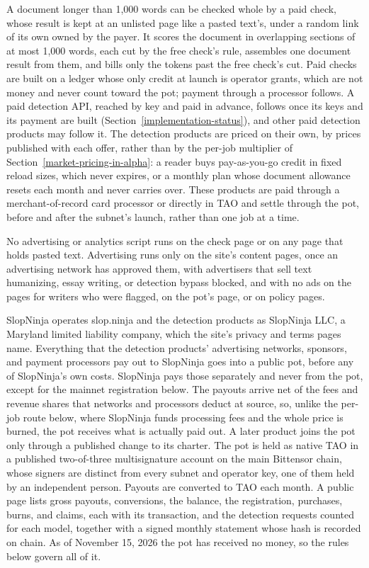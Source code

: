 A document longer than 1,000 words can be checked whole by a paid check, whose
result is kept at an unlisted page like a pasted text's, under a random link of
its own owned by the payer. It scores the document in
overlapping sections of at most 1,000 words, each cut by the free check's rule,
assembles one document result from them, and bills only the tokens past the
free check's cut. Paid checks are built on a ledger whose only credit at launch
is operator grants, which are not money and never count toward the pot; payment
through a processor follows. A paid detection API, reached by key and paid in
advance, follows once its keys and its payment are built
(Section~\ref{implementation-status}), and other paid detection products may
follow it. The detection products are priced on their own, by
prices published with each offer, rather than by the per-job multiplier of
Section~\ref{market-pricing-in-alpha}: a reader buys pay-as-you-go credit in
fixed reload sizes, which never expires, or a monthly plan whose document
allowance resets each month and never carries over. These products are paid
through a merchant-of-record card processor or directly in TAO and settle
through the pot, before and after the subnet's launch, rather than one job at a
time.

No advertising or analytics script runs on the check page or on any page that
holds pasted text. Advertising runs only on the site's content pages, once an
advertising network has approved them, with advertisers that sell text humanizing, essay writing,
or detection bypass blocked, and with no ads on the pages for writers who were
flagged, on the pot's page, or on policy pages.

SlopNinja operates slop.ninja and the detection products as SlopNinja LLC, a
Maryland limited liability company, which the site's privacy and terms pages
name. Everything that the detection products' advertising networks, sponsors,
and payment processors pay out to SlopNinja goes into a public pot, before any
of SlopNinja's own costs. SlopNinja pays those separately and never from the
pot, except for the mainnet registration below. The payouts arrive net of the fees
and revenue shares that networks and processors deduct at source, so, unlike
the per-job route below, where SlopNinja funds processing fees and the whole
price is burned, the pot receives what is actually paid out. A later product
joins the pot only through a published change to its charter. The pot is held
as native TAO in a published two-of-three multisignature account on the main
Bittensor chain, whose signers are distinct from every subnet and operator
key, one of them held by an independent person. Payouts are converted to TAO
each month. A public page lists gross payouts, conversions, the balance, the
registration, purchases, burns, and claims, each with its transaction, and the
detection requests counted for each model, together with a signed monthly
statement whose hash is recorded on chain. As of November 15, 2026 the pot has
received no money, so the rules below govern all of it.

